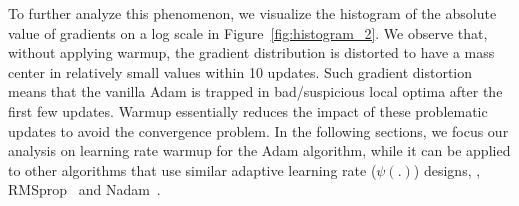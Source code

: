 To further analyze this phenomenon, we visualize the histogram of the absolute value of gradients on a log scale in Figure~\ref{fig:histogram_2}.
We observe that, without applying warmup, the gradient distribution is distorted to have a mass center in relatively small values within 10 updates. Such gradient distortion means that the vanilla Adam is trapped in bad/suspicious local optima after the first few updates. 
Warmup essentially reduces the impact of these problematic updates to avoid the convergence problem.
In the following sections, we focus our analysis on learning rate warmup for the Adam algorithm, while it can be applied to other algorithms that use similar adaptive learning rate ($\psi(.)$) designs, \eg, RMSprop~\citep{tieleman2012lecture} and Nadam~\citep{dozat2016incorporating}. 



